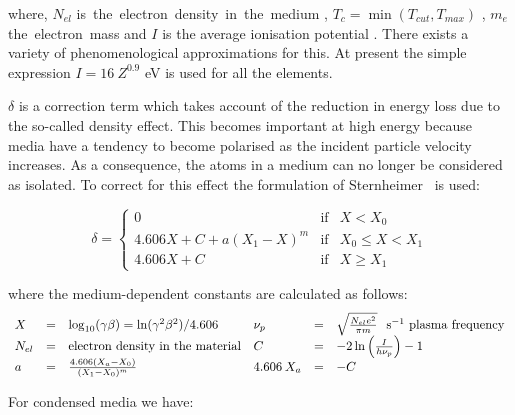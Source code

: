 where,
$ N_{el}$ \mbox{is the electron density in the medium} ,
$T _c = \min(T_{cut},T_{max})$ , $m_e$ \mbox{the electron mass}
and $I$ is the average ionisation potential .
There exists a variety of phenomenological approximations for this.
 At present the simple expression  $I=16\:Z^{0.9}$ eV is used for all the 
elements.

$\delta$ is a correction term which takes account of the reduction
in energy loss due to the so-called density effect. This becomes
important at high energy because media have a tendency to become
polarised as the incident particle velocity increases. As a consequence,
the atoms in a medium can no longer be considered as isolated. To correct
for this effect the formulation of Sternheimer~\cite{hion.sternheimer}
is used:

\begin{equation}
\delta = \left \{ \begin{array}{lll}
            0                   &    \mbox{if} & X  < X_0      \\
            4.606X + C + a(X_1-X)^m & \mbox{if} & X_0 \leq X < X_1 \\
            4.606X + C  & \mbox{if}  & X  \geq X_1
            \end{array} \right .
\end{equation}

where the medium-dependent constants are calculated as follows:
\[
\begin{array}{lcllcl}
X & = & \log_{10}(\gamma \beta) = \ln(\gamma^{2} \beta^{2})/4.606 &
\nu_{p} & = & \sqrt{ \frac{N_{el} e^2 }{\pi m} }
\mbox{\hspace{0.25cm}s$^{-1}$ plasma frequency} \\
N_{el} & = & \mbox{electron density in the material}
& C & = & -2 \ln \left ( \frac{I}{h\nu_{p}} \right ) - 1 \\
a & = & \frac{4.606(X_a - X_0)}{(X_1 - X_0)^m} & 4.606 \: X_{a} & = & -C
\end{array}
\]

For condensed media we have:

